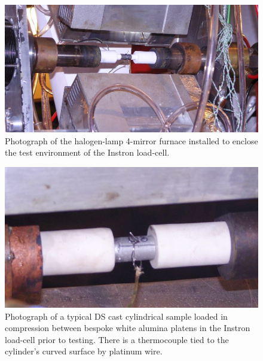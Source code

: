 \begin{figure}[H]
\begin{center}
\includegraphics[width=14cm]{enginxfurnace}
\caption{Photograph of the halogen-lamp 4-mirror furnace installed to enclose the test environment of the Instron load-cell.}\label{fig:enginxfurnace}
\end{center}
\end{figure}
%
%
\begin{figure}[H]
\begin{center}
\includegraphics[width=14cm]{enginxloadedsample}
\caption{Photograph of a typical DS cast cylindrical sample loaded in compression between bespoke white alumina platens in the Instron load-cell prior to testing.  There is a thermocouple tied to the cylinder's curved surface by platinum wire.}\label{fig:enginxloadedsample}
\end{center}
\end{figure}
%
%
